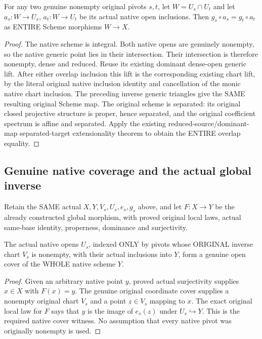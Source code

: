 \begin{lemma}
\label{lem:seven-original-native-inverse-chart-overlap-route}
\leanok
{}
For any two genuine nonempty original pivots $s,t$, let $W=U_s\cap U_t$
and let $a_s:W\to U_s$, $a_t:W\to U_t$ be its actual native open inclusions.
Then $g_s\circ a_s=g_t\circ a_t$ as ENTIRE Scheme morphisms $W\to X$.
\end{lemma}
\begin{proof}
The native scheme is integral. Both native opens are genuinely nonempty,
so the native generic point lies in their intersection. Their intersection
is therefore nonempty, dense and reduced. Reuse its existing dominant
dense-open generic lift. After either overlap inclusion this lift is the
corresponding existing chart lift, by the literal original native inclusion
identity and cancellation of the monic native chart inclusion. The preceding
inverse generic triangles give the SAME resulting original Scheme map.
The original scheme is separated: its original closed projective structure
is proper, hence separated, and the original coefficient spectrum is affine
and separated. Apply the existing reduced-source/dominant-map
separated-target extensionality theorem to obtain the ENTIRE overlap equality.
\end{proof}


\subsection{Genuine native coverage and the actual global inverse}
Retain the SAME actual $X,Y,V_s,U_s,e_s,g_s$ above, and let $F:X\to Y$
be the already constructed global morphism, with proved original local laws,
actual same-base identity, properness, dominance and surjectivity.

\begin{definition}
\label{def:seven-original-native-surjective-chart-cover-route}
\leanok
{}
The actual native opens $U_s$, indexed ONLY by pivots whose ORIGINAL
inverse chart $V_s$ is nonempty, with their actual inclusions into $Y$,
form a genuine open cover of the WHOLE native scheme $Y$.
\end{definition}
\begin{proof}
Given an arbitrary native point $y$, proved actual surjectivity supplies
$x\in X$ with $F(x)=y$. The genuine original coordinate cover supplies a
nonempty original chart $V_s$ and a point $z\in V_s$ mapping to $x$.
The exact original local law for $F$ says that $y$ is the image of $e_s(z)$
under $U_s\hookrightarrow Y$. This is the required native cover witness.
No assumption that every native pivot was originally nonempty is used.
\end{proof}


